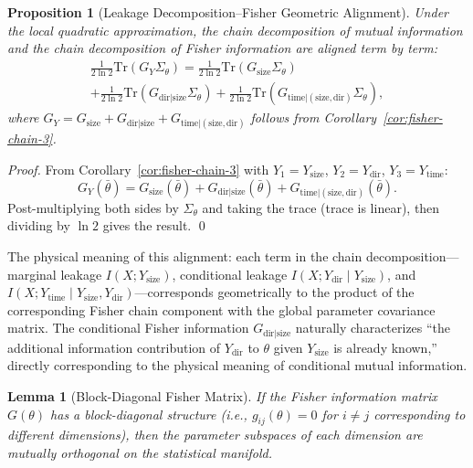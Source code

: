 \documentclass[lettersize,journal]{IEEEtran}
\newtheorem{lemma}{Lemma}
\newtheorem{proposition}{Proposition}
\begin{document}
\begin{proposition}[Leakage Decomposition--Fisher Geometric Alignment]\label{prop:leakage-isomorphism}
Under the local quadratic approximation, the chain decomposition of mutual
information and the chain decomposition of Fisher information are aligned
term by term:
\begin{multline}
\frac{1}{2\ln 2}\mathrm{Tr}(G_Y\Sigma_\theta)
  = \frac{1}{2\ln 2}\mathrm{Tr}(G_{\mathrm{size}}\Sigma_\theta)\\
  + \frac{1}{2\ln 2}\mathrm{Tr}(G_{\mathrm{dir}|\mathrm{size}}\Sigma_\theta)
  + \frac{1}{2\ln 2}\mathrm{Tr}(G_{\mathrm{time}|(\mathrm{size},\mathrm{dir})}\Sigma_\theta),
\end{multline}
where $G_Y = G_{\mathrm{size}} + G_{\mathrm{dir}|\mathrm{size}} + G_{\mathrm{time}|(\mathrm{size},\mathrm{dir})}$
follows from Corollary~\ref{cor:fisher-chain-3}.
\end{proposition}

\begin{proof}
From Corollary~\ref{cor:fisher-chain-3} with $Y_1=Y_{\mathrm{size}}$,
$Y_2=Y_{\mathrm{dir}}$, $Y_3=Y_{\mathrm{time}}$:
\[
G_Y(\bar\theta) = G_{\mathrm{size}}(\bar\theta)
  + G_{\mathrm{dir}|\mathrm{size}}(\bar\theta)
  + G_{\mathrm{time}|(\mathrm{size},\mathrm{dir})}(\bar\theta).
\]
Post-multiplying both sides by $\Sigma_\theta$ and taking the trace (trace
is linear), then dividing by $\ln 2$ gives the result. \qed
\end{proof}

The physical meaning of this alignment: each term in the chain
decomposition---marginal leakage $I(X;Y_{\mathrm{size}})$, conditional
leakage $I(X;Y_{\mathrm{dir}}\mid Y_{\mathrm{size}})$, and
$I(X;Y_{\mathrm{time}}\mid Y_{\mathrm{size}},Y_{\mathrm{dir}})$---corresponds
geometrically to the product of the corresponding Fisher chain component
with the global parameter covariance matrix.
The conditional Fisher information $G_{\mathrm{dir}|\mathrm{size}}$
naturally characterizes ``the additional information contribution of
$Y_{\mathrm{dir}}$ to $\theta$ given $Y_{\mathrm{size}}$ is already
known,'' directly corresponding to the physical meaning of conditional
mutual information.

\begin{lemma}[Block-Diagonal Fisher Matrix]\label{lem:block-diagonal}
If the Fisher information matrix $G(\theta)$ has a block-diagonal structure
(i.e., $g_{ij}(\theta)=0$ for $i\neq j$ corresponding to different
dimensions), then the parameter subspaces of each dimension are mutually
orthogonal on the statistical manifold.
\end{lemma}
\end{document}
